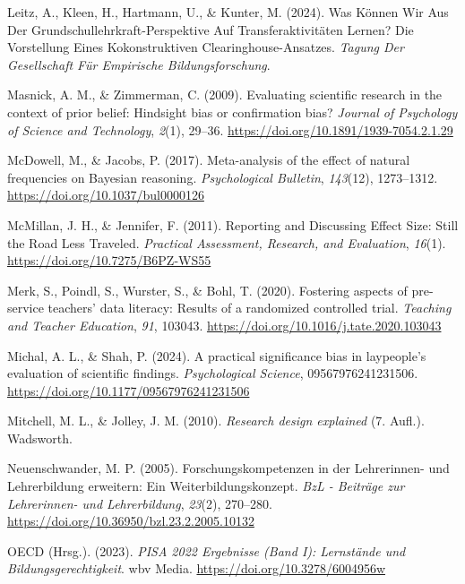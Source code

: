 \documentclass[
  man,
  floatsintext,
  longtable,
  nolmodern,
  notxfonts,
  notimes,
  colorlinks=true,linkcolor=blue,citecolor=blue,urlcolor=blue]{apa7}
\newlength{\cslhangindent}
\newenvironment{CSLReferences}[2] %
 {\begin{list}{}{%
  \setlength{\itemindent}{0pt}
  \setlength{\leftmargin}{0pt}
  \setlength{\parsep}{0pt}
  \ifodd #1
   \setlength{\leftmargin}{\cslhangindent}
   \setlength{\itemindent}{-1\cslhangindent}
  \fi
  \setlength{\itemsep}{#2\baselineskip}}}
 {\end{list}}
\begin{document}
\begin{CSLReferences}{1}{0}
Leitz, A., Kleen, H., Hartmann, U., \& Kunter, M. (2024). Was K{ö}nnen
Wir Aus Der {Grundschullehrkraft-Perspektive} Auf
{Transferaktivit{ä}ten} Lernen? {Die Vorstellung} Eines Kokonstruktiven
{Clearinghouse-Ansatzes}. \emph{Tagung Der {Gesellschaft} F{ü}r
{Empirische Bildungsforschung}}.

Masnick, A. M., \& Zimmerman, C. (2009). Evaluating scientific research
in the context of prior belief: Hindsight bias or confirmation bias?
\emph{Journal of Psychology of Science and Technology}, \emph{2}(1),
29--36. \url{https://doi.org/10.1891/1939-7054.2.1.29}

McDowell, M., \& Jacobs, P. (2017). Meta-analysis of the effect of
natural frequencies on Bayesian reasoning. \emph{Psychological
Bulletin}, \emph{143}(12), 1273--1312.
\url{https://doi.org/10.1037/bul0000126}

McMillan, J. H., \& Jennifer, F. (2011). Reporting and Discussing Effect
Size: {Still} the Road Less Traveled. \emph{Practical Assessment,
Research, and Evaluation}, \emph{16}(1).
\url{https://doi.org/10.7275/B6PZ-WS55}

Merk, S., Poindl, S., Wurster, S., \& Bohl, T. (2020). Fostering aspects
of pre-service teachers' data literacy: Results of a randomized
controlled trial. \emph{Teaching and Teacher Education}, \emph{91},
103043. \url{https://doi.org/10.1016/j.tate.2020.103043}

Michal, A. L., \& Shah, P. (2024). A practical significance bias in
laypeople's evaluation of scientific findings. \emph{Psychological
Science}, 09567976241231506.
\url{https://doi.org/10.1177/09567976241231506}

Mitchell, M. L., \& Jolley, J. M. (2010). \emph{Research design
explained} (7. Aufl.). Wadsworth.

Neuenschwander, M. P. (2005). Forschungskompetenzen in der Lehrerinnen-
und Lehrerbildung erweitern: Ein Weiterbildungskonzept. \emph{BzL -
Beiträge zur Lehrerinnen- und Lehrerbildung}, \emph{23}(2), 270--280.
\url{https://doi.org/10.36950/bzl.23.2.2005.10132}

OECD (Hrsg.). (2023). \emph{{PISA} 2022 {Ergebnisse} ({Band} {I}):
{Lernstände} und {Bildungsgerechtigkeit}}. wbv Media.
\url{https://doi.org/10.3278/6004956w}


\end{CSLReferences}
\end{document}

